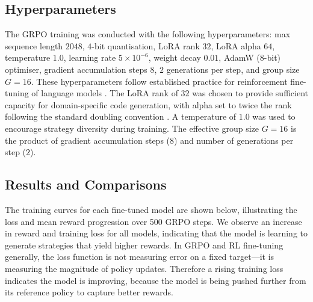 \documentclass[conference]{IEEEtran}
\begin{document}
\subsection{Hyperparameters}
\label{sec:hyperparameters}
The GRPO training was conducted with the following hyperparameters: max sequence length $2048$,
$4$-bit quantisation, LoRA rank $32$, LoRA alpha $64$, temperature $1.0$, learning rate
$5\times 10^{-6}$, weight decay $0.01$, AdamW (8-bit) optimiser, gradient accumulation steps $8$,
$2$ generations per step, and group size $G = 16$.
These hyperparameters follow established practice for reinforcement fine-tuning of language
models \cite{unsloth2024, openai2024rft}. The LoRA rank of $32$ was chosen to provide sufficient
capacity for domain-specific code generation, with alpha set to twice the rank following the
standard doubling convention \cite{hu2021lora}. A temperature of $1.0$ was used to encourage
strategy diversity during training. The effective group size $G = 16$ is the product of gradient
accumulation steps ($8$) and number of generations per step ($2$).

\subsection{Results and Comparisons}
\label{sec:results}
The training curves for each fine-tuned model are shown below, illustrating the loss and mean
reward progression over 500 GRPO steps. We observe an increase in reward and training loss for
all models, indicating that the model is learning to generate strategies that yield higher
rewards. In GRPO and RL fine-tuning generally, the loss function is not measuring error on a
fixed target---it is measuring the magnitude of policy updates. Therefore a rising training loss
indicates the model is improving, because the model is being pushed further from its reference
policy to capture better rewards.
\end{document}

